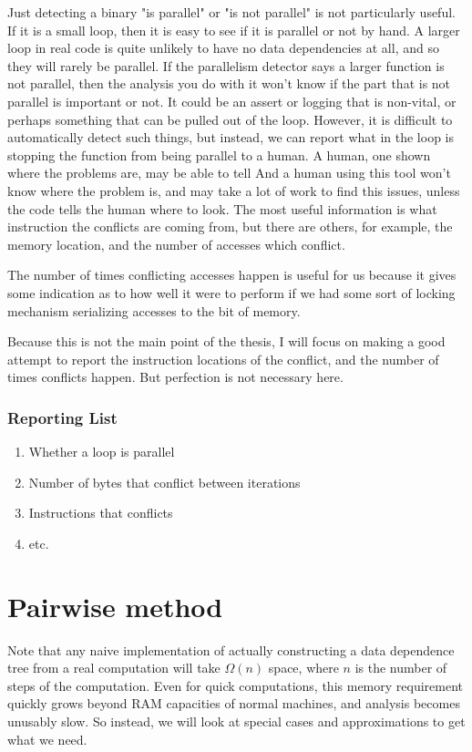 \documentclass[12pt,twoside]{reedthesis}
\begin{document}
		Just detecting a binary "is parallel" or "is not parallel" is not particularly useful. If it is a small loop, then it is easy to see if it is parallel or not by hand. A larger loop in real code is quite unlikely to have no data dependencies at all, and so they will rarely be parallel. If the parallelism detector says a larger function is not parallel, then the analysis you do with it won't know if the part that is not parallel is important or not. It could be an assert or logging that is non-vital, or perhaps something that can be pulled out of the loop. However, it is difficult to automatically detect such things, but instead, we can report what in the loop is stopping the function from being parallel to a human. A human, one shown where the problems are, may be able to tell  And a human using this tool won't know where the problem is, and may take a lot of work to find this issues, unless the code tells the human where to look. The most useful information is what instruction the conflicts are coming from, but there are others, for example, the memory location, and the number of accesses which conflict.

		The number of times conflicting accesses happen is useful for us because it gives some indication as to how well it were to perform if we had some sort of locking mechanism serializing accesses to the bit of memory.

		Because this is not the main point of the thesis, I will focus on making a good attempt to report the instruction locations of the conflict, and the number of times conflicts happen. But perfection is not necessary here.

		\subsubsection{Reporting List}
		\begin{enumerate}
			\item Whether a loop is parallel
			\item Number of bytes that conflict between iterations
			\item Instructions that conflicts
			\item etc.
		\end{enumerate}

	\section{Pairwise method}

		Note that any naive implementation of actually constructing a data dependence tree from a real computation will take $\Omega(n)$ space, where $n$ is the number of steps of the computation. Even for quick computations, this memory requirement quickly grows beyond RAM capacities of normal machines, and analysis becomes unusably slow. So instead, we will look at special cases and approximations to get what we need.
\end{document}
